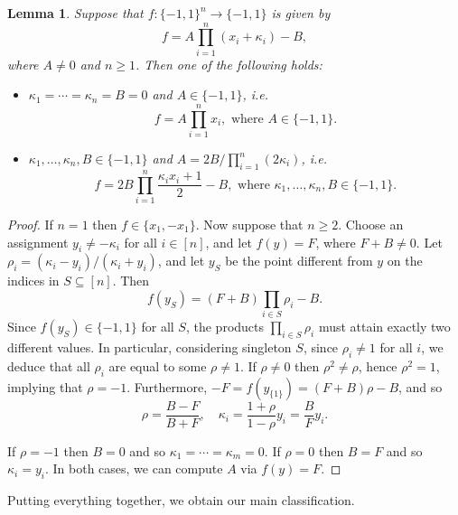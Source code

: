 \documentclass{article}
\newtheorem{lemma}[theorem]{Lemma}
\theoremstyle{definition}
\theoremstyle{remark}
\renewcommand\geq{\geqslant}
\begin{document}
\begin{lemma} \label{lem:boolean}
Suppose that $f\colon \{-1,1\}^n \to \{-1,1\}$ is given by
\[
 f = A \prod_{i=1}^n (x_i + \kappa_i) - B,
\]
where $A \neq 0$ and $n \geq 1$. Then one of the following holds:
\begin{itemize}
\item $\kappa_1 = \cdots = \kappa_n = B = 0$ and $A \in \{-1,1\}$, i.e.
\[
 f = A \prod_{i=1}^n x_i, \text{ where } A \in \{-1,1\}.
\]
\item $\kappa_1,\ldots,\kappa_n,B \in \{-1,1\}$ and $A = 2B/\prod_{i=1}^n (2\kappa_i)$, i.e.
\[
 f = 2B \prod_{i=1}^n \frac{\kappa_i x_i + 1}{2} - B, \text{ where } \kappa_1,\ldots,\kappa_n,B \in \{-1,1\}.
\]
\end{itemize}
\end{lemma}
\begin{proof}
If $n = 1$ then $f \in \{x_1,-x_1\}$. Now suppose that $n \geq 2$.
Choose an assignment $y_i \neq -\kappa_i$ for all $i \in [n]$, and let $f(y) = F$, where $F + B \neq 0$. Let $\rho_i = (\kappa_i - y_i)/(\kappa_i + y_i)$, and let $y_S$ be the point different from $y$ on the indices in $S \subseteq [n]$. Then
\[
 f(y_S) = (F + B) \prod_{i \in S} \rho_i - B.
\]
Since $f(y_S) \in \{-1,1\}$ for all $S$, the products $\prod_{i \in S} \rho_i$ must attain exactly two different values. In particular, considering singleton $S$, since $\rho_i \neq 1$ for all $i$, we deduce that all $\rho_i$ are equal to some $\rho \neq 1$. If $\rho \neq 0$ then $\rho^2 \neq \rho$, hence $\rho^2 = 1$, implying that $\rho = -1$. Furthermore, $-F = f(y_{\{1\}}) = (F+B)\rho - B$, and so
\[
 \rho = \frac{B-F}{B+F}, \quad \kappa_i = \frac{1+\rho}{1-\rho} y_i = \frac{B}{F} y_i.
\]

If $\rho = -1$ then $B = 0$ and so $\kappa_1 = \cdots = \kappa_m = 0$.
If $\rho = 0$ then $B = F$ and so $\kappa_i = y_i$. In both cases, we can compute $A$ via $f(y) = F$.
\end{proof}

Putting everything together, we obtain our main classification.
\end{document}
